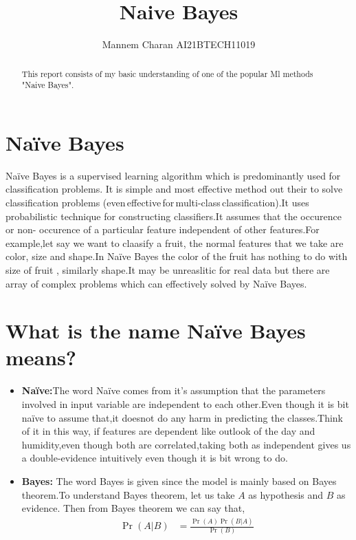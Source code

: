 \documentclass[journal,12pt,onecolumn]{IEEEtran}
\providecommand{\pr}[1]{\ensuremath{\Pr\left(#1\right)}}
\theoremstyle{remark}
\numberwithin{equation}{section}
\begin{document}
	  \title{Naive Bayes}
	  \author{ Mannem Charan AI21BTECH11019}
	  \maketitle
	   \begin{abstract}
		This report consists of my basic understanding of one of the popular Ml methods "Naive Bayes".
	   \end{abstract}
	   \section{Na\"ive Bayes}
	    Na\"ive Bayes is a supervised learning algorithm which is predominantly used for classification problems. It is simple and most effective method out their to solve classification problems (even\,effective\,for\,multi-class\,classification).It uses probabilistic technique for constructing classifiers.It assumes that the occurence or non- occurence of a particular feature independent of other features.For example,let say we want to claasify a fruit, the normal features that we take are color, size and shape.In Na\"ive Bayes the color of the fruit has nothing to do with size of fruit , similarly shape.It may be unreaslitic for real data but there are array of complex problems which can effectively solved by Na\"ive Bayes.
	   \section{What is the name Na\"ive Bayes means?}
            \begin{itemize}
		    \item \textbf{Na\"ive:}The word Na\"ive comes from it's assumption that the parameters involved in input variable are independent to each other.Even though it is bit na\"ive to assume that,it doesnot do any harm in predicting the classes.Think of it in this way, if features are dependent like outlook of the day and humidity,even though both are correlated,taking both as independent gives us a double-evidence intuitively even though it is bit wrong to do.
	            \item \textbf{Bayes:} The word Bayes is given since the model is mainly based on Bayes theorem.To understand Bayes theorem, let us take $A$ as hypothesis and $B$ as evidence. Then from Bayes theorem we can say that,
			    \begin{align}
				    \pr{A|B} &= \frac{\pr{A}\pr{B|A}}{\pr{B}}
			    \end{align}
            \end{itemize}
\end{document}

